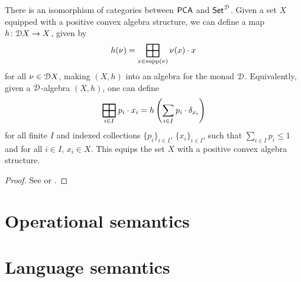 \begin{theorem}\label{c4:thm:correspondence}
	There is an isomorphism of categories between ${\mathsf{PCA}}$ and ${\mathsf{Set}}^{\mathcal{D}}$. Given a set $X$ equipped with a positive convex algebra structure, we can define a map $h \colon \mathcal{D} X \to X$, given by 
	$$
		h(\nu) = \bigboxplus_{x \in \supp(\nu)} \nu(x) \cdot x
	$$
	for all $\nu \in \mathcal{D} X$, making $(X, h)$ into an algebra for the monad $\mathcal{D}$. Equivalently, given a $\mathcal{D}$-algebra $(X, h)$, one can define 
	$$
		\bigboxplus_{i \in I} p_i \cdot x_i = h \left(\sum_{i \in I} p_i \cdot \delta_{x_i}\right)
	$$
	for all finite $I$ and indexed collections $\{p_i\}_{i \in I}$, $\{x_i\}_{i \in I}$, such that $\sum_{i \in I} p_i \leq 1$ and for all $i \in I$, $x_i \in X$. This equips the set $X$ with a positive convex algebra structure.  
	\end{theorem}
	\begin{proof}
		See \cite[Theorem~4]{Jacobs:2010:Convexity} or \cite[Proposition~5.3]{Doberkat:2008:Erratum}.
	\end{proof}
	\section{Operational semantics}
	\section{Language semantics}

 
